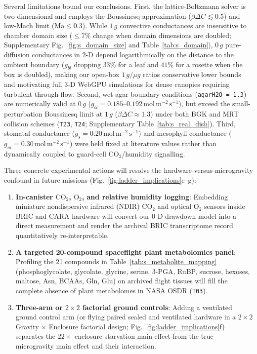 \documentclass[final,5p,times,twocolumn,numbers,sort&compress]{elsarticle}
\newcommand{\molms}{\ensuremath{\mathrm{mol\,m^{-2}\,s^{-1}}}}
\begin{document}
Several limitations bound our conclusions. First, the lattice-Boltzmann solver is two-dimensional and employs the Boussinesq approximation ($\beta\Delta C \lesssim 0.5$) and low-Mach limit ($\mathrm{Ma}\le 0.3$). While $1\,g$ convective conductances are insensitive to chamber domain size ($\le 7\%$ change when domain dimensions are doubled; Supplementary Fig.~\ref{fig:s_domain_size} and Table~\ref{tab:s_domain}), $0\,g$ pure-diffusion conductances in 2-D depend logarithmically on the distance to the ambient boundary ($g_{bl}$ dropping $33\%$ for a leaf and $41\%$ for a rosette when the box is doubled), making our open-box $1\,g/\mu g$ ratios conservative lower bounds and motivating full 3-D WebGPU simulations for dense canopies requiring turbulent through-flow. Second, wet-agar boundary conditions (\texttt{agarH2O = 1.3}) are numerically valid at $0\,g$ ($g_{bl} = 0.185\text{--}0.192\,\molms$), but exceed the small-perturbation Boussinesq limit at $1\,g$ ($\beta\Delta C\approx 1.3$) under both BGK and MRT collision schemes (\texttt{T23}, \texttt{T24}; Supplementary Table~\ref{tab:s_real_dish}). Third, stomatal conductance ($g_s = 0.20\,\molms$) and mesophyll conductance ($g_m = 0.30\,\molms$) were held fixed at literature values rather than dynamically coupled to guard-cell $\mathrm{CO_2}$/humidity signalling.

Three concrete experimental actions will resolve the hardware-versus-microgravity confound in future missions (Fig.~\ref{fig:ladder_implications}e--g):
\begin{enumerate}
    \item \textbf{In-canister $\mathrm{CO_2}$, $\mathrm{O_2}$, and relative humidity logging}: Embedding miniature nondispersive infrared (NDIR) $\mathrm{CO_2}$ and optical $\mathrm{O_2}$ sensors inside BRIC and CARA hardware will convert our 0-D drawdown model into a direct measurement and render the archival BRIC transcriptome record quantitatively re-interpretable.
    \item \textbf{A targeted 20-compound spaceflight plant metabolomics panel}: Profiling the 21 compounds in Table~\ref{tab:s_metabolite_mapping} (phosphoglycolate, glycolate, glycine, serine, 3-PGA, RuBP, sucrose, hexoses, maltose, Asn, BCAAs, Gln, Glu) on archived flight tissues will fill the complete absence of plant metabolomes in NASA OSDR (\texttt{T03}).
    \item \textbf{Three-arm or $2\times 2$ factorial ground controls}: Adding a ventilated ground control arm (or flying paired sealed and ventilated hardware in a $2\times 2$ Gravity $\times$ Enclosure factorial design; Fig.~\ref{fig:ladder_implications}f) separates the $22\times$ enclosure starvation main effect from the true microgravity main effect and their interaction.
\end{enumerate}
\end{document}
